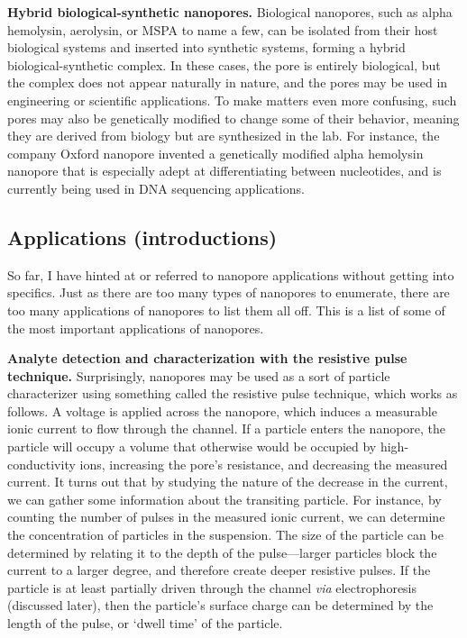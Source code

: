 			\textbf{Hybrid biological-synthetic nanopores.} Biological nanopores, such as alpha hemolysin, aerolysin, or MSPA to name a few, can be isolated from their host biological systems and inserted into synthetic systems, forming a hybrid biological-synthetic complex. In these cases, the pore is entirely biological, but the complex does not appear naturally in nature, and the pores may be used in engineering or scientific applications. To make matters even more confusing, such pores may also be genetically modified to change some of their behavior, meaning they are derived from biology but are synthesized in the lab. For instance, the company Oxford nanopore invented a genetically modified alpha hemolysin nanopore that is especially adept at differentiating between nucleotides, and is currently being used in DNA sequencing applications.

		\subsection{Applications (introductions)}

			So far, I have hinted at or referred to nanopore applications without getting into specifics. Just as there are too many types of nanopores to enumerate, there are too many applications of nanopores to list them all off. This is a list of some of the most important applications of nanopores.

			\textbf{Analyte detection and characterization with the resistive pulse technique.} Surprisingly, nanopores may be used as a sort of particle characterizer using something called the resistive pulse technique, which works as follows. A voltage is applied across the nanopore, which induces a measurable ionic current to flow through the channel. If a particle enters the nanopore, the particle will occupy a volume that otherwise would be occupied by high-conductivity ions, increasing the pore's resistance, and decreasing the measured current. It turns out that by studying the nature of the decrease in the current, we can gather some information about the transiting particle. For instance, by counting the number of pulses in the measured ionic current, we can determine the concentration of particles in the suspension. The size of the particle can be determined by relating it to the depth of the pulse---larger particles block the current to a larger degree, and therefore create deeper resistive pulses. If the particle is at least partially driven through the channel \textit{via} electrophoresis (discussed later), then the particle's surface charge can be determined by the length of the pulse, or `dwell time' of the particle.

